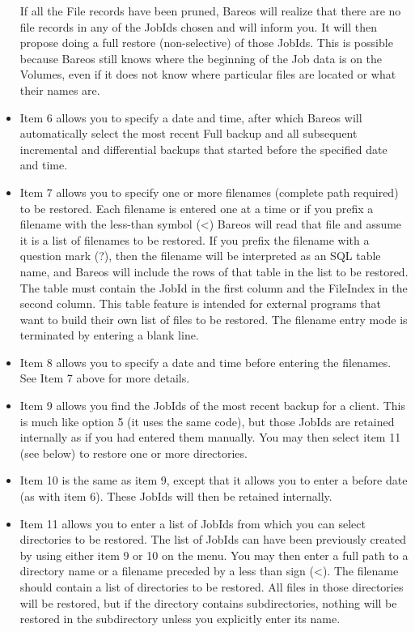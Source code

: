 \begin{itemize}
   If all the File records have been pruned, Bareos will realize that there
   are no file records in any of the JobIds chosen and will inform you. It
   will then propose doing a full restore (non-selective) of those JobIds.
   This is possible because Bareos still knows where the beginning of the
   Job data is on the Volumes, even if it does not know where particular
   files are located or what their names are.

\item Item 6 allows you to specify a date and time, after which Bareos  will
   automatically select the most recent Full backup and all  subsequent
   incremental and differential backups that started  before the specified date
   and time.

\item Item 7 allows you to specify one or more filenames  (complete path
   required) to be restored. Each filename  is entered one at a time or if you
   prefix a filename  with the less-than symbol ({\textless}) Bareos will read that
   file and assume it is a list of filenames to be restored.  If you
   prefix the filename with a question mark (?), then the filename will
   be interpreted as an SQL table name, and Bareos will include the rows
   of that table in the list to be restored. The table must contain the
   JobId in the first column and the FileIndex in the second column.
   This table feature is intended for external programs that want to build
   their own list of files to be restored.
   The filename entry mode is terminated by entering a  blank line.

\item Item 8 allows you to specify a date and time before  entering the
   filenames. See Item 7 above for more  details.

\item Item 9 allows you find the JobIds of the most recent backup for
   a client. This is much like option 5 (it uses the same code), but
   those JobIds are retained internally as if you had entered them
   manually.  You may then select item 11 (see below) to restore one
   or more directories.

\item Item 10 is the same as item 9, except that it allows you to enter
   a before date (as with item 6). These JobIds will then be retained
   internally.

\item Item 11 allows you to enter a list of JobIds from which you can
   select directories to be restored. The list of JobIds can have been
   previously created by using either item 9 or 10 on the menu.  You
   may then enter a full path to a directory name or a filename preceded
   by a less than sign ({\textless}). The filename should contain a list
   of directories to be restored.  All files in those directories will
   be restored, but if the directory contains subdirectories, nothing
   will be restored in the subdirectory unless you explicitly enter its
   name.


\end{itemize}
